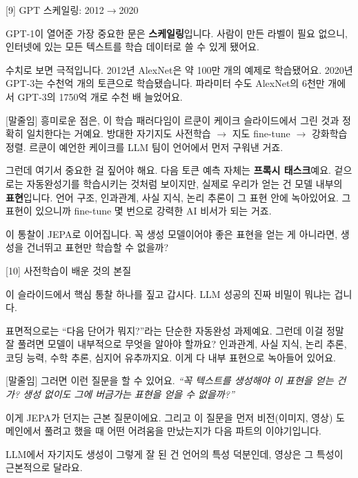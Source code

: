 \documentclass[aspectratio=169,10pt]{beamer}
\newenvironment{script}{%
  \footnotesize
  \setlength{\parskip}{0.5em}
  \setlength{\parindent}{0pt}
}{}
\begin{document}
\begin{frame}{[9] GPT 스케일링: 2012$\to$2020}
\begin{script}
GPT-1이 열어준 가장 중요한 문은 \textbf{스케일링}입니다. 사람이 만든 라벨이 필요 없으니, 인터넷에 있는 모든 텍스트를 학습 데이터로 쓸 수 있게 됐어요.

수치로 보면 극적입니다. 2012년 AlexNet은 약 100만 개의 예제로 학습됐어요. 2020년 GPT-3는 수천억 개의 토큰으로 학습됐습니다. 파라미터 수도 AlexNet의 6천만 개에서 GPT-3의 1750억 개로 수천 배 늘었어요.

[말줄임] 흥미로운 점은, 이 학습 패러다임이 르쿤이 케이크 슬라이드에서 그린 것과 정확히 일치한다는 거예요. 방대한 자기지도 사전학습 $\to$ 지도 fine-tune $\to$ 강화학습 정렬. 르쿤이 예언한 케이크를 LLM 팀이 언어에서 먼저 구워낸 거죠.

그런데 여기서 중요한 걸 짚어야 해요. 다음 토큰 예측 자체는 \textbf{프록시 태스크}예요. 겉으로는 자동완성기를 학습시키는 것처럼 보이지만, 실제로 우리가 얻는 건 모델 내부의 \textbf{표현}입니다. 언어 구조, 인과관계, 사실 지식, 논리 추론이 그 표현 안에 녹아있어요. 그 표현이 있으니까 fine-tune 몇 번으로 강력한 AI 비서가 되는 거죠.

이 통찰이 JEPA로 이어집니다. 꼭 생성 모델이어야 좋은 표현을 얻는 게 아니라면, 생성을 건너뛰고 표현만 학습할 수 없을까?
\end{script}
\end{frame}

\begin{frame}{[10] 사전학습이 배운 것의 본질}
\begin{script}
이 슬라이드에서 핵심 통찰 하나를 짚고 갑시다. LLM 성공의 진짜 비밀이 뭐냐는 겁니다.

표면적으로는 ``다음 단어가 뭐지?''라는 단순한 자동완성 과제예요. 그런데 이걸 정말 잘 풀려면 모델이 내부적으로 무엇을 알아야 할까요? 인과관계, 사실 지식, 논리 추론, 코딩 능력, 수학 추론, 심지어 유추까지요. 이게 다 내부 표현으로 녹아들어 있어요.

[말줄임] 그러면 이런 질문을 할 수 있어요. \textit{``꼭 텍스트를 생성해야 이 표현을 얻는 건가? 생성 없이도 그에 버금가는 표현을 얻을 수 없을까?''}

이게 JEPA가 던지는 근본 질문이에요. 그리고 이 질문을 먼저 비전(이미지, 영상) 도메인에서 풀려고 했을 때 어떤 어려움을 만났는지가 다음 파트의 이야기입니다.

LLM에서 자기지도 생성이 그렇게 잘 된 건 언어의 특성 덕분인데, 영상은 그 특성이 근본적으로 달라요.
\end{script}
\end{frame}
\end{document}

